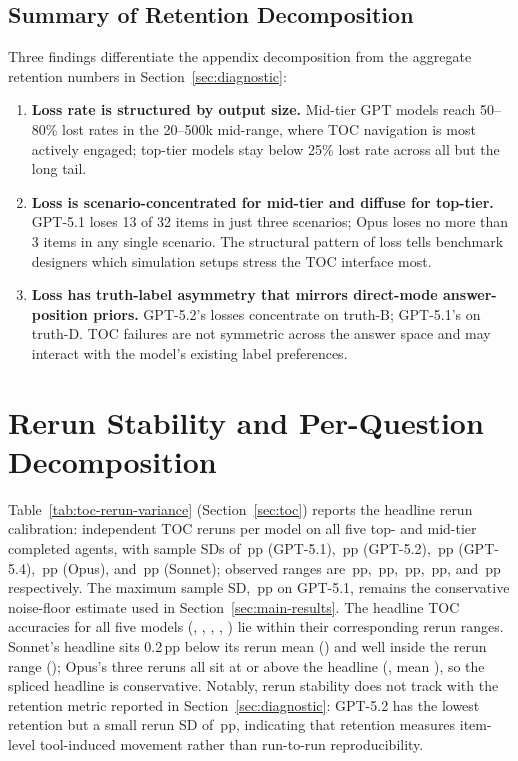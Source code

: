 \documentclass{article}
\begin{document}
\subsection{Summary of Retention Decomposition}

Three findings differentiate the appendix decomposition from the aggregate retention numbers in Section~\ref{sec:diagnostic}:

\begin{enumerate}[leftmargin=*, itemsep=2pt]
    \item \textbf{Loss rate is structured by output size.} Mid-tier GPT models reach 50--80\% lost rates in the 20--500k mid-range, where TOC navigation is most actively engaged; top-tier models stay below 25\% lost rate across all but the long tail.
    \item \textbf{Loss is scenario-concentrated for mid-tier and diffuse for top-tier.} GPT-5.1 loses 13 of 32 items in just three scenarios; Opus loses no more than 3 items in any single scenario. The structural pattern of loss tells benchmark designers which simulation setups stress the TOC interface most.
    \item \textbf{Loss has truth-label asymmetry that mirrors direct-mode answer-position priors.} GPT-5.2's losses concentrate on truth-B; GPT-5.1's on truth-D. TOC failures are not symmetric across the answer space and may interact with the model's existing label preferences.
\end{enumerate}

\section{Rerun Stability and Per-Question Decomposition}
\label{sec:appendix-stability}

Table~\ref{tab:toc-rerun-variance} (Section~\ref{sec:toc}) reports the headline rerun calibration: \TOCRerunNumSamples{} independent TOC reruns per model on all five top- and mid-tier completed agents, with sample SDs of \GPTFiveOneTOCRerunSD\,pp (GPT-5.1), \GPTFiveTwoTOCRerunSD\,pp (GPT-5.2), \GPTFiveFourTOCRerunSD\,pp (GPT-5.4), \OpusTOCRerunSD\,pp (Opus), and \SonnetTOCRerunSD\,pp (Sonnet); observed ranges are \GPTFiveOneTOCRerunRange\,pp, \GPTFiveTwoTOCRerunRange\,pp, \GPTFiveFourTOCRerunRange\,pp, \OpusTOCRerunRange\,pp, and \SonnetTOCRerunRange\,pp respectively. The maximum sample SD, \TOCRerunMaxSD\,pp on GPT-5.1, remains the conservative noise-floor estimate used in Section~\ref{sec:main-results}. The headline TOC accuracies for all five models (\GPTFiveOneTOC{}, \GPTFiveTwoTOC{}, \GPTFiveFourTOC{}, \OpusTOC{}, \SonnetTOC{}) lie within their corresponding rerun ranges. Sonnet's headline sits 0.2\,pp below its rerun mean (\SonnetTOCRerunMean) and well inside the rerun range (\SonnetTOCRerunValues); Opus's three reruns all sit at or above the headline (\OpusTOCRerunValues, mean \OpusTOCRerunMean), so the spliced \OpusTOC{} headline is conservative. Notably, rerun stability does not track with the retention metric reported in Section~\ref{sec:diagnostic}: GPT-5.2 has the lowest retention but a small rerun SD of \GPTFiveTwoTOCRerunSD\,pp, indicating that retention measures item-level tool-induced movement rather than run-to-run reproducibility.
\end{document}
